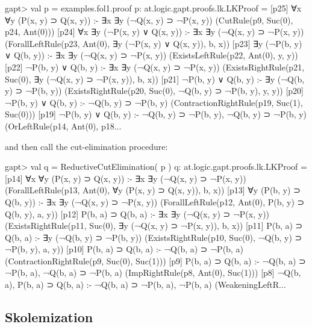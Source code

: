\documentclass[a4paper,11pt]{article}
\begin{document}
\begin{clilisting}
gapt> val p = examples.fol1.proof
p: at.logic.gapt.proofs.lk.LKProof =
[p25] ∀x ∀y (P(x, y) ⊃ Q(x, y)) :- ∃x ∃y (¬Q(x, y) ⊃ ¬P(x, y))    (CutRule(p9, Suc(0), p24, Ant(0)))
[p24] ∀x ∃y (¬P(x, y) ∨ Q(x, y)) :- ∃x ∃y (¬Q(x, y) ⊃ ¬P(x, y))    (ForallLeftRule(p23, Ant(0), ∃y (¬P(x, y) ∨ Q(x, y)), b, x))
[p23] ∃y (¬P(b, y) ∨ Q(b, y)) :- ∃x ∃y (¬Q(x, y) ⊃ ¬P(x, y))    (ExistsLeftRule(p22, Ant(0), y, y))
[p22] ¬P(b, y) ∨ Q(b, y) :- ∃x ∃y (¬Q(x, y) ⊃ ¬P(x, y))    (ExistsRightRule(p21, Suc(0), ∃y (¬Q(x, y) ⊃ ¬P(x, y)), b, x))
[p21] ¬P(b, y) ∨ Q(b, y) :- ∃y (¬Q(b, y) ⊃ ¬P(b, y))    (ExistsRightRule(p20, Suc(0), ¬Q(b, y) ⊃ ¬P(b, y), y, y))
[p20] ¬P(b, y) ∨ Q(b, y) :- ¬Q(b, y) ⊃ ¬P(b, y)    (ContractionRightRule(p19, Suc(1), Suc(0)))
[p19] ¬P(b, y) ∨ Q(b, y) :- ¬Q(b, y) ⊃ ¬P(b, y), ¬Q(b, y) ⊃ ¬P(b, y)    (OrLeftRule(p14, Ant(0), p18...
\end{clilisting}
%
and then call the cut-elimination procedure:
\begin{clilisting}
gapt> val q = ReductiveCutElimination( p )
q: at.logic.gapt.proofs.lk.LKProof =
[p14] ∀x ∀y (P(x, y) ⊃ Q(x, y)) :- ∃x ∃y (¬Q(x, y) ⊃ ¬P(x, y))    (ForallLeftRule(p13, Ant(0), ∀y (P(x, y) ⊃ Q(x, y)), b, x))
[p13] ∀y (P(b, y) ⊃ Q(b, y)) :- ∃x ∃y (¬Q(x, y) ⊃ ¬P(x, y))    (ForallLeftRule(p12, Ant(0), P(b, y) ⊃ Q(b, y), a, y))
[p12] P(b, a) ⊃ Q(b, a) :- ∃x ∃y (¬Q(x, y) ⊃ ¬P(x, y))    (ExistsRightRule(p11, Suc(0), ∃y (¬Q(x, y) ⊃ ¬P(x, y)), b, x))
[p11] P(b, a) ⊃ Q(b, a) :- ∃y (¬Q(b, y) ⊃ ¬P(b, y))    (ExistsRightRule(p10, Suc(0), ¬Q(b, y) ⊃ ¬P(b, y), a, y))
[p10] P(b, a) ⊃ Q(b, a) :- ¬Q(b, a) ⊃ ¬P(b, a)    (ContractionRightRule(p9, Suc(0), Suc(1)))
[p9] P(b, a) ⊃ Q(b, a) :- ¬Q(b, a) ⊃ ¬P(b, a), ¬Q(b, a) ⊃ ¬P(b, a)    (ImpRightRule(p8, Ant(0), Suc(1)))
[p8] ¬Q(b, a), P(b, a) ⊃ Q(b, a) :- ¬Q(b, a) ⊃ ¬P(b, a), ¬P(b, a)    (WeakeningLeftR...
\end{clilisting}


\subsection{Skolemization}
\end{document}
